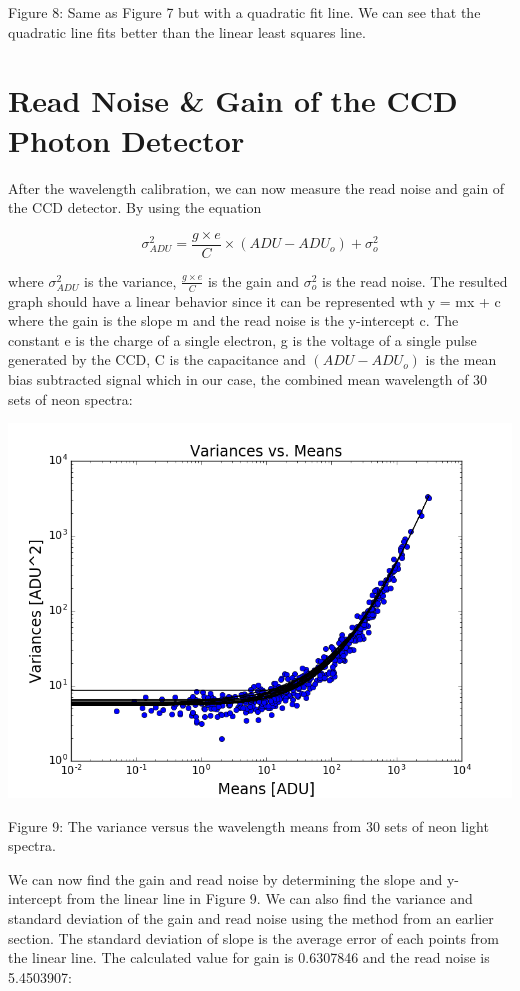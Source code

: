\documentclass[onecolumn, 12pt, a4paper]{article}
\begin{document}
\begin{flushleft}
Figure 8: Same as Figure 7 but with a quadratic fit line. We can see that the quadratic line fits better than the linear least squares line.
\end{flushleft}

\section{Read Noise \& Gain of the CCD Photon Detector} \label{CCD}

After the wavelength calibration, we can now measure the read noise and gain of the CCD detector.
By using the equation

\[\sigma^2_{ADU} = \frac{g \times e}{C} \times (ADU - ADU_o) + \sigma^2_{o}\]

where  $\sigma^2_{ADU}$ is the variance, $\frac{g \times e}{C}$ is the gain and $\sigma^2_{o}$ is the read noise. The resulted graph should have a linear behavior since it can be represented wth y = mx + c where the gain is the slope m and the read noise is the y-intercept c. The constant e is the charge of a single electron, g is the voltage of a single pulse generated by the CCD, C is the capacitance and $(ADU - ADU_o)$ is the mean bias subtracted signal which in our case, the combined mean wavelength of 30 sets of neon spectra: 

\centerline{\includegraphics[scale = .45]{varmean.png}}
\newline
\begin{flushleft}
Figure 9: The variance versus the wavelength means from 30 sets of neon light spectra.
\end{flushleft}
We can now find the gain and read noise by determining the slope and y-intercept from the linear line in Figure 9. We can also find the variance and standard deviation of the gain and read noise using the method from an earlier section. The standard deviation of slope is the average error of each points from the linear line. The calculated value for gain is 0.6307846 and the read noise is 5.4503907:
\newline
\end{document}

